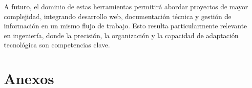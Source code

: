 \documentclass[runningheads]{llncs}
\begin{document}
A futuro, el dominio de estas herramientas permitirá abordar proyectos de mayor complejidad, integrando desarrollo web, documentación técnica y gestión de información en un mismo flujo de trabajo. Esto resulta particularmente relevante en ingeniería, donde la precisión, la organización y la capacidad de adaptación tecnológica son competencias clave.

\section{Anexos}








\end{document}
